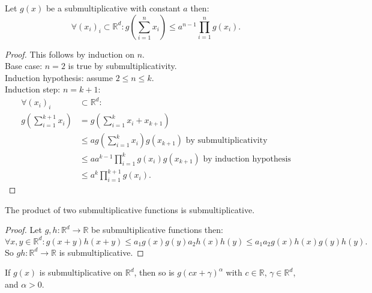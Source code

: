 \documentclass[a4paper,11pt]{article}
\begin{document}
\begin{lemma}
    Let $g(x)$ be a submultiplicative with constant $a$ then:
    \begin{equation}
        \forall (x_{i})_{i} \subset \mathbb{R}^d:
        g\left(\sum_{i=1}^{n} x_{i}\right) \le a^{n-1} \prod_{i=1}^{n} g(x_{i})  .
    \end{equation}
\end{lemma}

\begin{proof}
    This follows by induction on $n$. \\
    Base case: $n=2$ is true by submultiplicativity. \\
    Induction hypothesis: assume $2 \le  n \le k$. \\
    Induction step: $n=k+1$:
    \begin{align}
        \forall (x_{i})_{i}                  & \subset \mathbb{R}^d:                                                                          \\
        g\left(\sum_{i=1}^{k+1} x_{i}\right) & = g\left(\sum_{i=1}^{k} x_{i} + x_{k+1}\right)                                                 \\
                                             & \le a g\left(\sum_{i=1}^{k} x_{i}\right) g(x_{k+1})  \text{ by submultiplicativity}            \\
                                             & \le a a^{k-1} \prod_{i=1}^{k}  g\left(x_{i}\right) g(x_{k+1})  \text{ by induction hypothesis} \\
                                             & \le a^{k} \prod_{i=1}^{k+1}  g\left(x_{i}\right) .
    \end{align}
\end{proof}

\begin{lemma}
    The product of two submultiplicative functions is submultiplicative.
\end{lemma}

\begin{proof}
    Let $g,h:\mathbb{R}^{d}\rightarrow \mathbb{R}$ be submultiplicative functions then:
    $$
        \forall x,y \in \mathbb{R}^{d}: g(x+y)h(x+y) \le a_{1} g(x)g(y) a_{2} h(x)h(y) \leq a_{1}a_{2} g(x)h(x)g(y)h(y).
    $$
    So $gh:\mathbb{R}^{d}\rightarrow \mathbb{R}$ is submultiplicative.
\end{proof}

\begin{lemma}
    If $g(x)$ is submultiplicative on $\mathbb{R}^{d}$, then so is $g(c x+\gamma)^{\alpha}$
    with $c \in \mathbb{R}$, $\gamma \in \mathbb{R}^{d}$, and $\alpha>0$.
\end{lemma}
\end{document}
